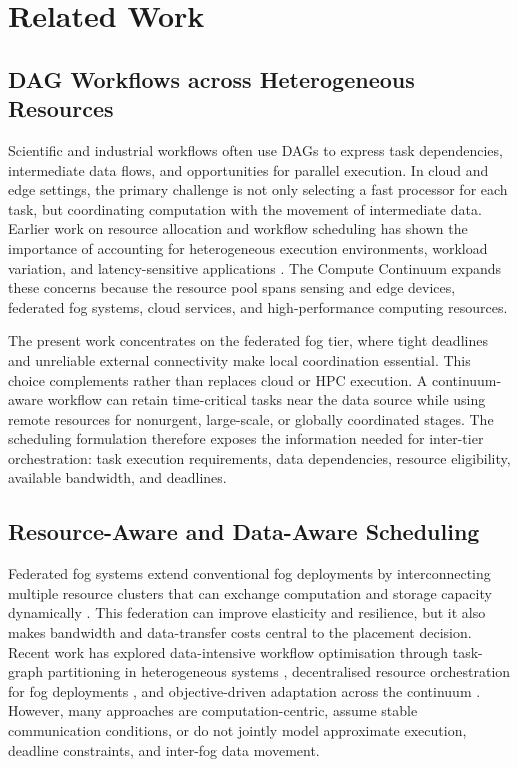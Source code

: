 \section{Related Work }
\label{sec:related_work}

\subsection{DAG Workflows across Heterogeneous Resources}

Scientific and industrial workflows often use DAGs to express task dependencies, intermediate data flows, and opportunities for parallel execution. In cloud and edge settings, the primary challenge is not only selecting a fast processor for each task, but coordinating computation with the movement of intermediate data. Earlier work on resource allocation and workflow scheduling has shown the importance of accounting for heterogeneous execution environments, workload variation, and latency-sensitive applications \cite{kang2021adaptive,ahmad2014workflow}. The Compute Continuum expands these concerns because the resource pool spans sensing and edge devices, federated fog systems, cloud services, and high-performance computing resources.

The present work concentrates on the federated fog tier, where tight deadlines and unreliable external connectivity make local coordination essential. This choice complements rather than replaces cloud or HPC execution. A continuum-aware workflow can retain time-critical tasks near the data source while using remote resources for nonurgent, large-scale, or globally coordinated stages. The scheduling formulation therefore exposes the information needed for inter-tier orchestration: task execution requirements, data dependencies, resource eligibility, available bandwidth, and deadlines.

\subsection{Resource-Aware and Data-Aware Scheduling}

Federated fog systems extend conventional fog deployments by interconnecting multiple resource clusters that can exchange computation and storage capacity dynamically \cite{fgcs2024}. This federation can improve elasticity and resilience, but it also makes bandwidth and data-transfer costs central to the placement decision. Recent work has explored data-intensive workflow optimisation through task-graph partitioning in heterogeneous systems \cite{ahmad2014workflow}, decentralised resource orchestration for fog deployments \cite{nunezgomez2024lighthidra}, and objective-driven adaptation across the continuum \cite{sedlak2024equilibrium}. However, many approaches are computation-centric, assume stable communication conditions, or do not jointly model approximate execution, deadline constraints, and inter-fog data movement.

